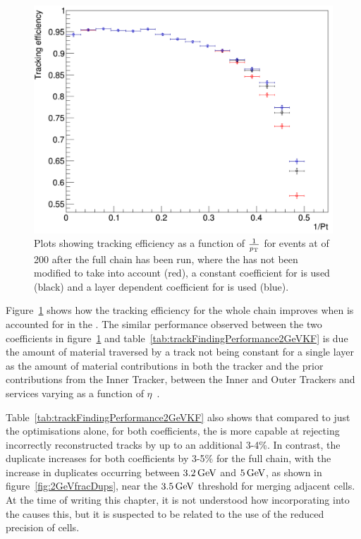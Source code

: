 \begin{figure}[tbp]
\centering
\includegraphics[width=\textwidth]{figs/tk-upgrade/results-lowPtTracking/kfTrackingEffVsInvPtFlatGeometry_5000.pdf}
\caption{Plots showing tracking efficiency as a function of $\frac{1}{p_{\mathrm{T}}}$ for \ttbar events at \PU of 200 after the full chain has been run, where the \KF has not been modified to take \MS into account (red), a constant coefficient for \MS is used (black) and a layer dependent coefficient for \MS is used (blue).
}
\label{fig:2GeVTiltEff}	
\end{figure}

Figure~\ref{fig:2GeVTiltEff} shows how the tracking efficiency for the whole chain improves when \MS is accounted for in the \KF.
The similar performance observed between the two coefficients in figure~\ref{fig:2GeVTiltEff} and table~\ref{tab:trackFindingPerformance2GeVKF} is due the amount of material traversed by a track not being constant for a single layer as the amount of material contributions in both the tracker and the prior contributions from the Inner Tracker, between the Inner and Outer Trackers and services varying as a function of $\eta$~\cite{P2TrackerTDR}.

Table~\ref{tab:trackFindingPerformance2GeVKF} also shows that compared to just the \HT optimisations alone, for both \MS  coefficients, the \KF is more capable at rejecting incorrectly reconstructed tracks by up to an additional 3-4\%.
In contrast, the duplicate increases for both coefficients by 3-5\% for the full chain, with the increase in duplicates occurring between $3.2\,\text{Ge\hspace{-.08em}V}$ and $5\,\text{Ge\hspace{-.08em}V}$, as shown in figure~\ref{fig:2GeVfracDups}, near the $3.5\,\text{Ge\hspace{-.08em}V}$ threshold for merging adjacent \HT cells.
At the time of writing this chapter, it is not understood how incorporating \MS into the \KF causes this, but it is suspected to be related to the use of the reduced precision of \HT cells.

